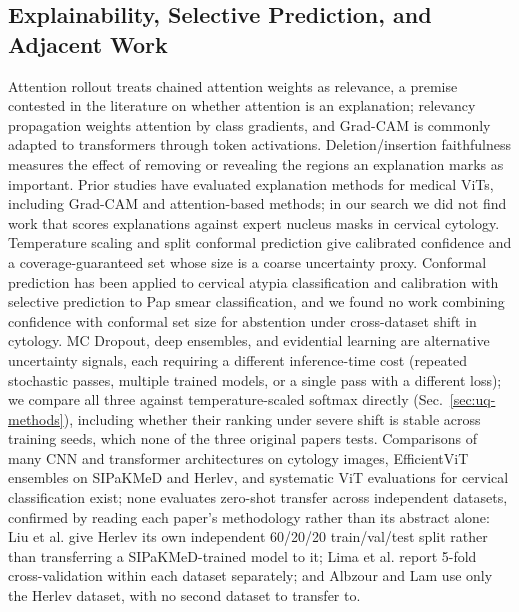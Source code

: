 \documentclass[12pt,letterpaper]{article}
\begin{document}
\subsection{Explainability, Selective Prediction, and Adjacent Work}
Attention rollout\cite{abnar2020quantifying} treats chained attention weights as relevance, a premise contested in the literature on whether attention is an explanation;\cite{jain2019,wiegreffe2019} relevancy propagation\cite{chefer2021transformer} weights attention by class gradients, and Grad-CAM\cite{selvaraju2017gradcam} is commonly adapted to transformers through token activations. Deletion/insertion faithfulness\cite{petsiuk2018rise} measures the effect of removing or revealing the regions an explanation marks as important. Prior studies have evaluated explanation methods for medical ViTs, including Grad-CAM and attention-based methods;\cite{barekatain2026,chung2025,komorowski2023} in our search we did not find work that scores explanations against expert nucleus masks in cervical cytology. Temperature scaling\cite{guo2017calibration} and split conformal prediction\cite{angelopoulos2023} give calibrated confidence and a coverage-guaranteed set whose size is a coarse uncertainty proxy. Conformal prediction has been applied to cervical atypia classification\cite{hagos2026} and calibration with selective prediction to Pap smear classification,\cite{albzour2026selective} and we found no work combining confidence with conformal set size for abstention under cross-dataset shift in cytology. MC Dropout,\cite{gal2016dropout} deep ensembles,\cite{lakshminarayanan2017ensembles} and evidential learning\cite{sensoy2018evidential} are alternative uncertainty signals, each requiring a different inference-time cost (repeated stochastic passes, multiple trained models, or a single pass with a different loss); we compare all three against temperature-scaled softmax directly (Sec.~\ref{sec:uq-methods}), including whether their ranking under severe shift is stable across training seeds, which none of the three original papers tests. Comparisons of many CNN and transformer architectures on cytology images,\cite{liu2021aspect} EfficientViT ensembles on SIPaKMeD and Herlev,\cite{lima2025} and systematic ViT evaluations for cervical classification\cite{albzour2026cancers} exist; none evaluates zero-shot transfer across independent datasets, confirmed by reading each paper's methodology rather than its abstract alone: Liu et al.\cite{liu2021aspect} give Herlev its own independent 60/20/20 train/val/test split rather than transferring a SIPaKMeD-trained model to it; Lima et al.\cite{lima2025} report 5-fold cross-validation within each dataset separately; and Albzour and Lam\cite{albzour2026cancers} use only the Herlev dataset, with no second dataset to transfer to.
\end{document}
